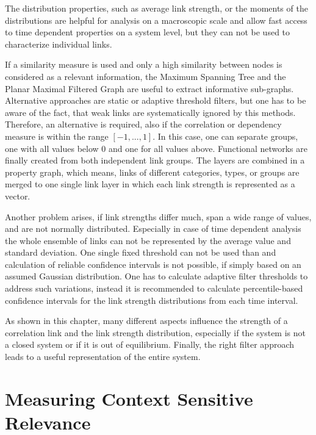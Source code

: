 \documentclass[a4paper,10pt]{scrbook}
\begin{document}
The distribution properties, such as average link strength, or the moments of the distributions are helpful for analysis on a macroscopic scale and allow fast access to time dependent properties on a system level, but they can not be used to characterize individual links.

If a similarity measure is used and only a high similarity between nodes is considered as a relevant information, the Maximum Spanning Tree and the Planar Maximal Filtered Graph are useful to extract informative sub-graphs. Alternative approaches are static or adaptive threshold filters, but one has to be aware of the fact, that weak links are systematically ignored by this methods. Therefore, an alternative is required, also 
if the correlation or dependency measure is within the range $[-1, ..., 1]$. In this case, one can separate groups, one with all values below 0 and one for all values above. Functional networks are finally created from both independent link groups. The layers are combined in a property graph, which means, links of different categories, types, or groups are merged to one single link layer in which each link strength is represented as a vector.

Another problem arises, if link strengths differ much, span a wide range of values, and are not normally distributed. Especially in case of time dependent analysis the whole ensemble of links can not be represented by the average value and standard deviation. One single fixed threshold can not be used than and calculation of reliable confidence intervals is not possible, if simply based on an assumed Gaussian distribution. One has to calculate adaptive filter thresholds to address such variations, instead it is recommended to calculate percentile-based confidence intervals for the link strength distributions from each time interval. 


As shown in this chapter, many different aspects influence the strength of a correlation link and the link strength distribution, especially if the system is not a closed system or if it is out of equilibrium. Finally, the right filter approach leads to a useful representation of the entire system. 




\chapter{Measuring Context Sensitive Relevance}
\label{chap.ContextsensitiveRelevance} 
\label{chap.RELEVANZ}
\end{document}
